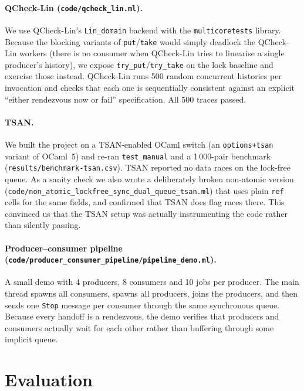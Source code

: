\documentclass[11pt,a4paper]{article}
\begin{document}
\paragraph{QCheck-Lin
(\texttt{code/qcheck\_lin.ml}).}
We use QCheck-Lin's \texttt{Lin\_domain} backend with the
\texttt{multicoretests} library. Because the
blocking variants of \texttt{put}/\texttt{take} would simply deadlock
the QCheck-Lin workers (there is no consumer when QCheck-Lin tries to
linearise a single producer's history), we expose
\texttt{try\_put}/\texttt{try\_take} on the lock baseline and
exercise those instead. QCheck-Lin runs 500 random concurrent
histories per invocation and checks that each one is sequentially
consistent against an explicit ``either rendezvous now or fail''
specification. All 500 traces passed.

\paragraph{TSAN.}
We built the project on a TSAN-enabled OCaml switch
(an \texttt{options+tsan} variant of OCaml~5) and re-ran
\texttt{test\_manual} and a 1\,000-pair benchmark
(\texttt{results/benchmark-tsan.csv}). TSAN reported no data races on
the lock-free queue. As a sanity check we also wrote a deliberately
broken non-atomic version
(\texttt{code/non\_atomic\_lockfree\_sync\_dual\_queue\_tsan.ml}) that
uses plain \texttt{ref} cells for the same fields, and confirmed that
TSAN does flag races there. This convinced us that the TSAN setup
was actually instrumenting the code rather than silently passing.

\paragraph{Producer--consumer pipeline
(\texttt{code/producer\_consumer\_pipeline/pipeline\_demo.ml}).}
A small demo with 4 producers, 8 consumers and 10 jobs per producer.
The main thread spawns all consumers, spawns all producers, joins the
producers, and then sends one \texttt{Stop} message per consumer through
the same synchronous queue. Because every handoff is a rendezvous,
the demo verifies that producers and consumers actually wait for each
other rather than buffering through some implicit queue.

\section{Evaluation}
\label{sec:evaluation}
\end{document}

